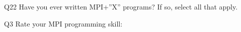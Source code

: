 \begin{description}%
\item{Q22} Have you ever written MPI+”X” programs? If so, select all that apply.%
\item{Q3} Rate your MPI programming skill:%
\end{description}%
